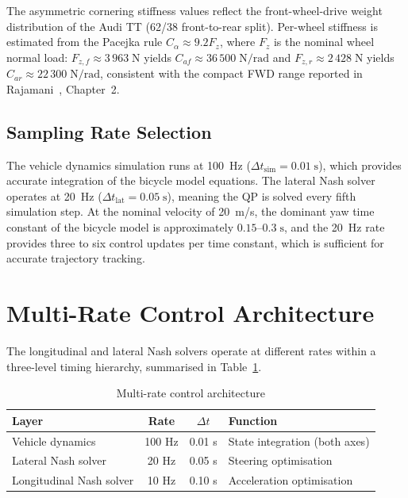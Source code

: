 \documentclass[12pt,a4paper,oneside]{report}
\begin{document}
The asymmetric cornering stiffness values reflect the front-wheel-drive weight distribution
of the Audi TT (62/38 front-to-rear split). Per-wheel stiffness is estimated from the
Pacejka rule $C_\alpha \approx 9.2 F_z$, where $F_z$ is the nominal wheel normal load:
$F_{z,f} \approx 3\,963\;\mathrm{N}$ yields $C_{af} \approx 36\,500\;\mathrm{N/rad}$
and $F_{z,r} \approx 2\,428\;\mathrm{N}$ yields $C_{ar} \approx 22\,300\;\mathrm{N/rad}$,
consistent with the compact FWD range reported in Rajamani~\cite{rajamaniVehicleDynamicsControl2005},
Chapter~2.

\subsection{Sampling Rate Selection}

The vehicle dynamics simulation runs at 100~Hz ($\Delta t_{\mathrm{sim}} = 0.01\;\mathrm{s}$),
which provides accurate integration of the bicycle model equations. The lateral Nash solver
operates at 20~Hz ($\Delta t_{\mathrm{lat}} = 0.05\;\mathrm{s}$), meaning the QP is solved
every fifth simulation step. At the nominal velocity of 20~m/s, the dominant yaw time
constant of the bicycle model is approximately $0.15$--$0.3\;\mathrm{s}$, and the 20~Hz
rate provides three to six control updates per time constant, which is sufficient for
accurate trajectory tracking.

\section{Multi-Rate Control Architecture}

The longitudinal and lateral Nash solvers operate at different rates within a three-level
timing hierarchy, summarised in Table~\ref{tab:multi_rate}.

\begin{table}[ht]
\centering
\begin{tabular}{|l|c|c|l|}
\hline
\textbf{Layer} & \textbf{Rate} & $\Delta t$ & \textbf{Function} \\
\hline
Vehicle dynamics      & 100 Hz & 0.01 s & State integration (both axes) \\
Lateral Nash solver   &  20 Hz & 0.05 s & Steering optimisation \\
Longitudinal Nash solver & 10 Hz & 0.10 s & Acceleration optimisation \\
\hline
\end{tabular}
\caption{Multi-rate control architecture}
\label{tab:multi_rate}
\end{table}
\end{document}
